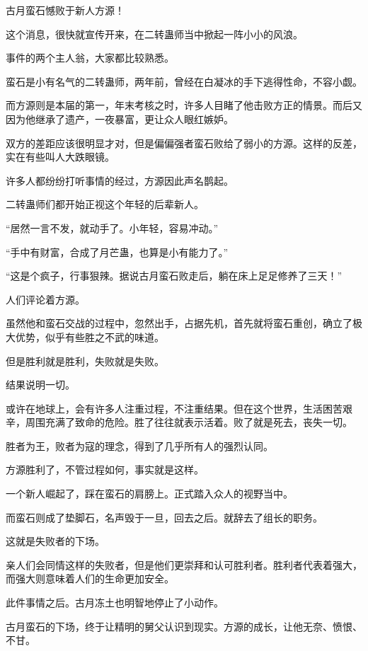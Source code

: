
\begin{this_body}

古月蛮石憾败于新人方源！

这个消息，很快就宣传开来，在二转蛊师当中掀起一阵小小的风浪。

事件的两个主人翁，大家都比较熟悉。

蛮石是小有名气的二转蛊师，两年前，曾经在白凝冰的手下逃得性命，不容小觑。

而方源则是本届的第一，年末考核之时，许多人目睹了他击败方正的情景。而后又因为他继承了遗产，一夜暴富，更让众人眼红嫉妒。

双方的差距应该很明显才对，但是偏偏强者蛮石败给了弱小的方源。这样的反差，实在有些叫人大跌眼镜。

许多人都纷纷打听事情的经过，方源因此声名鹊起。

二转蛊师们都开始正视这个年轻的后辈新人。

“居然一言不发，就动手了。小年轻，容易冲动。”

“手中有财富，合成了月芒蛊，也算是小有能力了。”

“这是个疯子，行事狠辣。据说古月蛮石败走后，躺在床上足足修养了三天！”

人们评论着方源。

虽然他和蛮石交战的过程中，忽然出手，占据先机，首先就将蛮石重创，确立了极大优势，似乎有些胜之不武的味道。

但是胜利就是胜利，失败就是失败。

结果说明一切。

或许在地球上，会有许多人注重过程，不注重结果。但在这个世界，生活困苦艰辛，周围充满了致命的危险。胜了往往就表示活着。败了就是死去，丧失一切。

胜者为王，败者为寇的理念，得到了几乎所有人的强烈认同。

方源胜利了，不管过程如何，事实就是这样。

一个新人崛起了，踩在蛮石的肩膀上。正式踏入众人的视野当中。

而蛮石则成了垫脚石，名声毁于一旦，回去之后。就辞去了组长的职务。

这就是失败者的下场。

亲人们会同情这样的失败者，但是他们更崇拜和认可胜利者。胜利者代表着强大，而强大则意味着人们的生命更加安全。

此件事情之后。古月冻土也明智地停止了小动作。

古月蛮石的下场，终于让精明的舅父认识到现实。方源的成长，让他无奈、愤恨、不甘。


\end{this_body}
